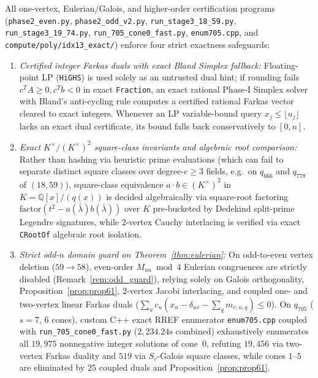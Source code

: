 \documentclass[11pt,reqno]{amsart}
\theoremstyle{definition}
\theoremstyle{remark}
\numberwithin{equation}{section}
\numberwithin{table}{section}
\begin{document}
All one-vertex, Eulerian/Galois, and higher-order certification programs (\nolinkurl{phase2_even.py}, \nolinkurl{phase2_odd_v2.py}, \nolinkurl{run_stage3_18_59.py}, \nolinkurl{run_stage3_19_74.py}, \nolinkurl{run_705_cone0_fast.py}, \nolinkurl{enum705.cpp}, and \nolinkurl{compute/poly/idx13_exact/}) enforce four strict exactness safeguards:
\begin{enumerate}
  \item \emph{Certified integer Farkas duals with exact Bland Simplex fallback:} Floating-point LP (\texttt{HiGHS}) is used solely as an untrusted dual hint; if rounding fails $c^T A \ge 0, c^T b < 0$ in exact \texttt{Fraction}, an exact rational Phase-I Simplex solver with Bland's anti-cycling rule computes a certified rational Farkas vector cleared to exact integers. Whenever an LP variable-bound query $x_j \le \lfloor u_j \rfloor$ lacks an exact dual certificate, its bound falls back conservatively to $[0, n]$.
  \item \emph{Exact $K^\times/(K^\times)^2$ square-class invariants and algebraic root comparison:} Rather than hashing via heuristic prime evaluations (which can fail to separate distinct square classes over degree-$e \ge 3$ fields, e.g.\ on $q_{666}$ and $q_{778}$ of $(18, 59)$), square-class equivalence $a \cdot b \in (K^\times)^2$ in $K = \mathbb{Q}[x]/(q(x))$ is decided algebraically via square-root factoring $\mathrm{factor}(t^2 - a(\bar{\lambda})b(\bar{\lambda}))$ over $K$ pre-bucketed by Dedekind split-prime Legendre signatures, while $2$-vertex Cauchy interlacing is verified via exact \texttt{CRootOf} algebraic root isolation.
  \item \emph{Strict odd-$n$ domain guard on Theorem~\ref{thm:eulerian}:} On odd-to-even vertex deletion ($59 \to 58$), even-order $M_{uu} \bmod 4$ Eulerian congruences are strictly disabled (Remark~\ref{rem:odd_guard}), relying solely on Galois orthogonality, Proposition~\ref{prop:prop61}, $2$-vertex Jacobi interlacing, and coupled one- and two-vertex linear Farkas duals ($\sum_u c_u (x_u - \delta_{uv} - \sum_q m_{v,u,q}) \le 0$). On $q_{705}$ ($s = 7$, $6$ cones), custom C++ exact RREF enumerator \nolinkurl{enum705.cpp} coupled with \nolinkurl{run_705_cone0_fast.py} ($2{,}234.24\text{s}$ combined) exhaustively enumerates all $19{,}975$ nonnegative integer solutions of cone~$0$, refuting $19{,}456$ via two-vertex Farkas duality and $519$ via $S_v$-Galois square classes, while cones $1$--$5$ are eliminated by $25$ coupled duals and Proposition~\ref{prop:prop61}.

\end{enumerate}
\end{document}
